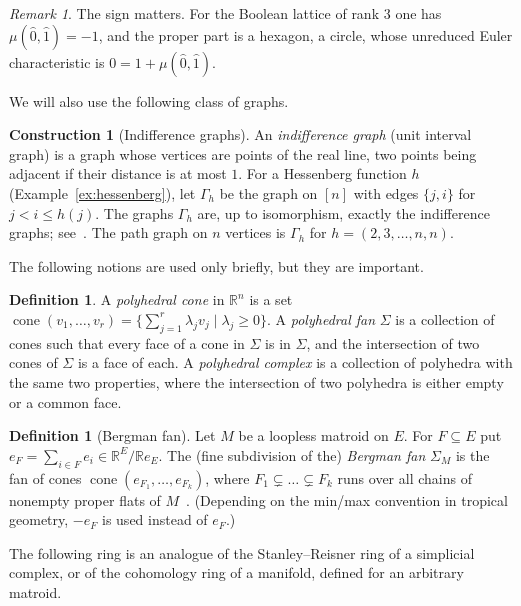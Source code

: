 \documentclass[11pt,a4paper]{article}
\numberwithin{equation}{section}
\theoremstyle{plain}
\theoremstyle{definition}
\newtheorem{definition}[theorem]{Definition}
\newtheorem{construction}[theorem]{Construction}
\theoremstyle{remark}
\newtheorem{remark}[theorem]{Remark}
\newcommand{\R}{\mathbb{R}}
\DeclareMathOperator{\cone}{cone}
\begin{document}
\begin{remark}
The sign matters. For the Boolean lattice of rank $3$ one has $\mu(\hat0,\hat1)=-1$, and the proper part is a hexagon, a circle, whose unreduced Euler characteristic is $0=1+\mu(\hat0,\hat1)$.
\end{remark}

We will also use the following class of graphs.

\begin{construction}[Indifference graphs]\label{con:indifference}
An \emph{indifference graph} (unit interval graph) is a graph whose vertices are points of the real line, two points being adjacent if their distance is at most $1$. For a Hessenberg function $h$ (Example~\ref{ex:hessenberg}), let $\Gamma_h$ be the graph on $[n]$ with edges $\{j,i\}$ for $j<i\leqslant h(j)$. The graphs $\Gamma_h$ are, up to isomorphism, exactly the indifference graphs; see~\cite[Rem.~3.1]{AB21}. The path graph on $n$ vertices is $\Gamma_h$ for $h=(2,3,\dots,n,n)$.
\end{construction}

The following notions are used only briefly, but they are important.

\begin{definition}
A \emph{polyhedral cone} in $\R^n$ is a set $\cone(v_1,\dots,v_r)=\{\sum_{j=1}^r\lambda_jv_j\mid\lambda_j\geqslant0\}$. A \emph{polyhedral fan} $\Sigma$ is a collection of cones such that every face of a cone in $\Sigma$ is in $\Sigma$, and the intersection of two cones of $\Sigma$ is a face of each. A \emph{polyhedral complex} is a collection of polyhedra with the same two properties, where the intersection of two polyhedra is either empty or a common face.
\end{definition}

\begin{definition}[Bergman fan]
Let $M$ be a loopless matroid on $E$. For $F\subseteq E$ put $e_F=\sum_{i\in F}e_i\in\R^E/\R e_E$. The (fine subdivision of the) \emph{Bergman fan} $\Sigma_M$ is the fan of cones $\cone(e_{F_1},\dots,e_{F_k})$, where $F_1\subsetneq\dots\subsetneq F_k$ runs over all chains of nonempty proper flats of $M$~\cite{AK06,FY04}. (Depending on the min/max convention in tropical geometry, $-e_F$ is used instead of $e_F$.)
\end{definition}

The following ring is an analogue of the Stanley--Reisner ring of a simplicial complex, or of the cohomology ring of a manifold, defined for an arbitrary matroid.
\end{document}
